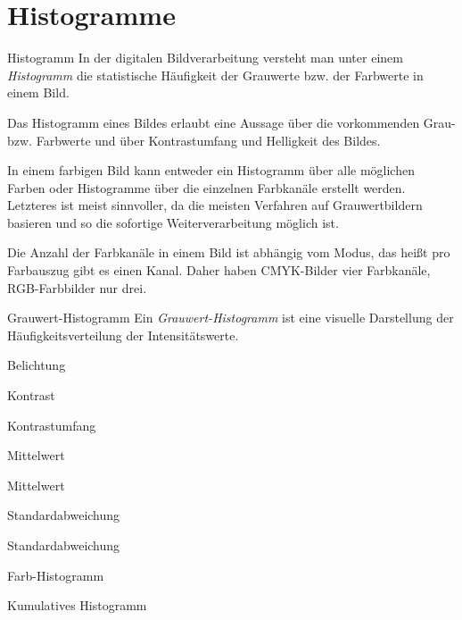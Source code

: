 \section{Histogramme}

\begin{defi}{Histogramm}
    In der digitalen Bildverarbeitung versteht man unter einem \emph{Histogramm} die statistische Häufigkeit der Grauwerte bzw. der Farbwerte in einem Bild.

    Das Histogramm eines Bildes erlaubt eine Aussage über die vorkommenden Grau- bzw. Farbwerte und über Kontrastumfang und Helligkeit des Bildes.

    In einem farbigen Bild kann entweder ein Histogramm über alle möglichen Farben oder Histogramme über die einzelnen Farbkanäle erstellt werden.
    Letzteres ist meist sinnvoller, da die meisten Verfahren auf Grauwertbildern basieren und so die sofortige Weiterverarbeitung möglich ist.

    Die Anzahl der Farbkanäle in einem Bild ist abhängig vom Modus, das heißt pro Farbauszug gibt es einen Kanal.
    Daher haben CMYK-Bilder vier Farbkanäle, RGB-Farbbilder nur drei.
\end{defi}

\begin{defi}{Grauwert-Histogramm}
    Ein \emph{Grauwert-Histogramm} ist eine visuelle Darstellung der Häufigkeitsverteilung der Intensitätswerte.


\end{defi}

\begin{defi}{Belichtung}

\end{defi}

\begin{defi}{Kontrast}

\end{defi}

\begin{defi}{Kontrastumfang}

\end{defi}

\begin{defi}[Histogramm]{Mittelwert}

\end{defi}

\begin{example}[Histogramm]{Mittelwert}

\end{example}

\begin{defi}[Histogramm]{Standardabweichung}

\end{defi}

\begin{example}[Histogramm]{Standardabweichung}

\end{example}

\begin{defi}{Farb-Histogramm}

\end{defi}

\begin{defi}{Kumulatives Histogramm}

\end{defi}

